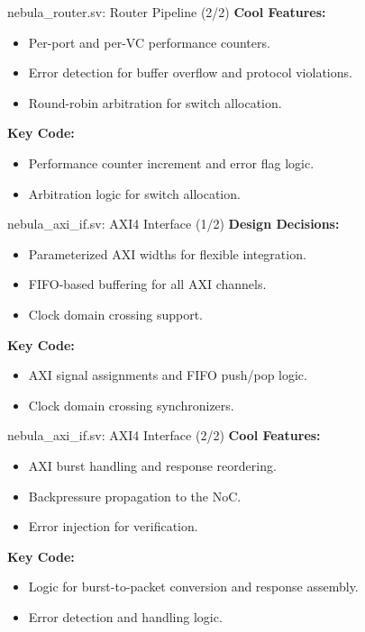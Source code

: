 \documentclass{beamer}
\begin{document}
\begin{frame}{nebula\_router.sv: Router Pipeline (2/2)}
  \textbf{Cool Features:}
  \begin{itemize}
    \item Per-port and per-VC performance counters.
    \item Error detection for buffer overflow and protocol violations.
    \item Round-robin arbitration for switch allocation.
  \end{itemize}
  \textbf{Key Code:}
  \begin{itemize}
    \item Performance counter increment and error flag logic.
    \item Arbitration logic for switch allocation.
  \end{itemize}
\end{frame}

\begin{frame}{nebula\_axi\_if.sv: AXI4 Interface (1/2)}
  \textbf{Design Decisions:}
  \begin{itemize}
    \item Parameterized AXI widths for flexible integration.
    \item FIFO-based buffering for all AXI channels.
    \item Clock domain crossing support.
  \end{itemize}
  \textbf{Key Code:}
  \begin{itemize}
    \item AXI signal assignments and FIFO push/pop logic.
    \item Clock domain crossing synchronizers.
  \end{itemize}
\end{frame}

\begin{frame}{nebula\_axi\_if.sv: AXI4 Interface (2/2)}
  \textbf{Cool Features:}
  \begin{itemize}
    \item AXI burst handling and response reordering.
    \item Backpressure propagation to the NoC.
    \item Error injection for verification.
  \end{itemize}
  \textbf{Key Code:}
  \begin{itemize}
    \item Logic for burst-to-packet conversion and response assembly.
    \item Error detection and handling logic.
  \end{itemize}
\end{frame}
\end{document}
